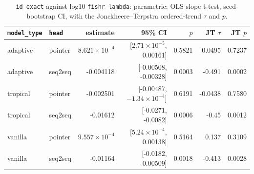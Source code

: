 \documentclass[10pt]{article}
\begin{document}
{\small
\begin{longtable}{llrrrrr}
\caption{\texttt{id\_exact} against log10 \texttt{fishr\_lambda}: parametric: OLS slope t-test, seed-bootstrap CI, with the Jonckheere--Terpstra ordered-trend $\tau$ and $p$.}\label{tab:trend-id_exact}\\
\toprule
\texttt{model\_type} & \texttt{head} & estimate & 95\% CI & $p$ & JT $\tau$ & JT $p$\\
\midrule
\endhead
adaptive & pointer & $8.621\times10^{-4}$ & [$2.71\times10^{-5}$, 0.00161] & 0.5821 & 0.0495 & 0.7237\\
adaptive & seq2seq & -0.004118 & [-0.00508, -0.00328] & 0.0003 & -0.491 & 0.0002\\
tropical & pointer & -0.002501 & [-0.00487, $-1.34\times10^{-4}$] & 0.6191 & -0.0438 & 0.7580\\
tropical & seq2seq & -0.01612 & [-0.0271, -0.0082] & 0.0006 & -0.45 & 0.0012\\
vanilla & pointer & $9.557\times10^{-4}$ & [$5.24\times10^{-4}$, 0.00138] & 0.5164 & 0.137 & 0.3109\\
vanilla & seq2seq & -0.01164 & [-0.0182, -0.00509] & 0.0018 & -0.413 & 0.0028\\
\bottomrule
\end{longtable}
}
\end{document}
